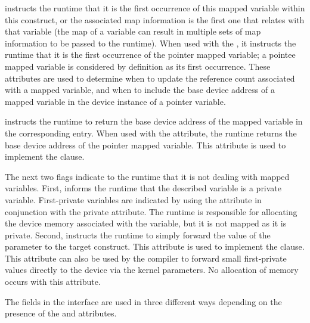  instructs the runtime that it is the first occurrence of this mapped variable within this construct, or the associated map information is the first one that relates with that variable (the map of a variable can result in multiple sets of map information to be passed to the runtime).  When used with  the , it instructs the runtime that it is the first occurrence of the pointer mapped variable; a pointee mapped variable is considered by definition as its first occurrence. These attributes are used to determine when to update the reference count associated with a mapped variable, and when to include the base device address of a mapped variable in the device instance of a pointer variable. 

 instructs the runtime to return the base device address of the mapped variable in the corresponding  entry. When used with  the  attribute, the runtime returns the base device address of the pointer mapped variable. This attribute is used to implement the  clause.

The next two flags indicate to the runtime that it is not dealing with mapped variables.  First,  informs the runtime that the described variable is a private variable. First-private variables are indicated by using the    attribute in conjunction with the private attribute. The runtime is responsible for allocating the device memory associated with the variable, but it is not mapped as it is private. Second,  instructs the runtime to simply forward the value of the  parameter to the target construct.  This attribute is used to implement the  clause. This attribute can also be used by the compiler to forward small first-private values directly to the device via the kernel parameters. No allocation of memory occurs with this attribute.

The fields in the interface are used in three different ways depending on the presence of the  and  attributes.


